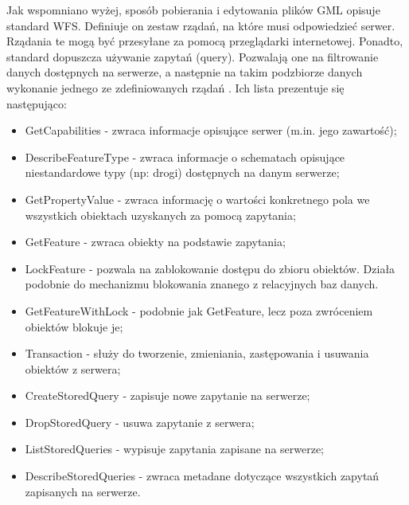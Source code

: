 Jak wspomniano wyżej, sposób pobierania i edytowania plików GML opisuje standard WFS. Definiuje on zestaw rządań, na które musi odpowiedzieć serwer.
Rządania te mogą być przesyłane za pomocą przeglądarki internetowej. Ponadto, standard dopuszcza używanie zapytań (query). Pozwalają one
na filtrowanie danych dostępnych na serwerze, a następnie na takim podzbiorze danych wykonanie jednego ze zdefiniowanych rządań \cite{OpenGIS_WFS2010}.
Ich lista prezentuje się następująco:
\begin{itemize}
    \item GetCapabilities - zwraca informacje opisujące serwer (m.in. jego zawartość);
    \item DescribeFeatureType - zwraca informacje o schematach opisujące niestandardowe typy (np: drogi) dostępnych na danym serwerze;
    \item GetPropertyValue - zwraca informację o wartości konkretnego pola we wszystkich obiektach uzyskanych za pomocą zapytania;
    \item GetFeature - zwraca obiekty na podstawie zapytania;
    \item LockFeature - pozwala na zablokowanie dostępu do zbioru obiektów. Działa podobnie do mechanizmu blokowania znanego z relacyjnych
        baz danych.
    \item GetFeatureWithLock - podobnie jak GetFeature, lecz poza zwróceniem obiektów blokuje je;
    \item Transaction - służy do tworzenie, zmieniania, zastępowania i usuwania obiektów z serwera;
    \item CreateStoredQuery - zapisuje nowe zapytanie na serwerze;
    \item DropStoredQuery - usuwa zapytanie z serwera;
    \item ListStoredQueries - wypisuje zapytania zapisane na serwerze;
    \item DescribeStoredQueries - zwraca metadane dotyczące wszystkich zapytań zapisanych na serwerze.
\end{itemize}

